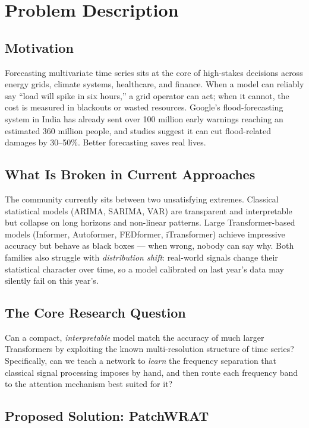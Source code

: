 \documentclass[11pt, letterpaper]{article}
\begin{document}
\section{Problem Description}

\subsection{Motivation}

Forecasting multivariate time series sits at the core of high-stakes decisions across energy grids, climate systems, healthcare, and finance. When a model can reliably say ``load will spike in six hours,'' a grid operator can act; when it cannot, the cost is measured in blackouts or wasted resources. Google's flood-forecasting system in India has already sent over 100 million early warnings reaching an estimated 360 million people, and studies suggest it can cut flood-related damages by 30--50\%. Better forecasting saves real lives.

\subsection{What Is Broken in Current Approaches}

The community currently sits between two unsatisfying extremes. Classical statistical models (ARIMA, SARIMA, VAR) are transparent and interpretable but collapse on long horizons and non-linear patterns. Large Transformer-based models (Informer, Autoformer, FEDformer, iTransformer) achieve impressive accuracy but behave as black boxes --- when wrong, nobody can say why. Both families also struggle with \emph{distribution shift}: real-world signals change their statistical character over time, so a model calibrated on last year's data may silently fail on this year's.

\subsection{The Core Research Question}

Can a compact, \emph{interpretable} model match the accuracy of much larger Transformers by exploiting the known multi-resolution structure of time series? Specifically, can we teach a network to \emph{learn} the frequency separation that classical signal processing imposes by hand, and then route each frequency band to the attention mechanism best suited for it?

\subsection{Proposed Solution: PatchWRAT}
\end{document}
